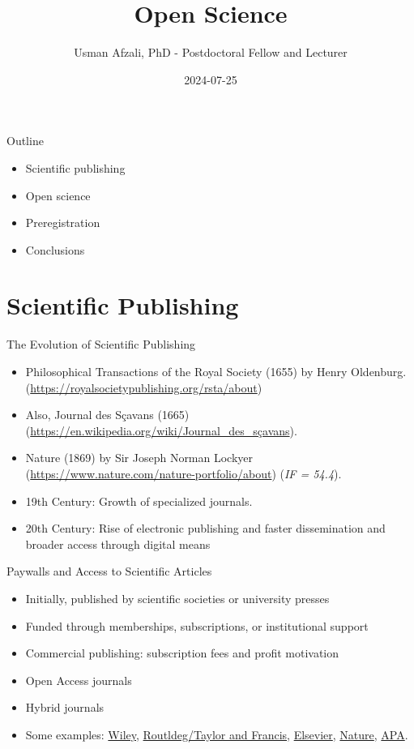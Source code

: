 \documentclass[
  ignorenonframetext,
  aspectratio=169,
]{beamer}
\title{Open Science}
\author{Usman Afzali, PhD - Postdoctoral Fellow and Lecturer}
\date{2024-07-25}
\institute{University of Canterbury}
\providecommand{\tightlist}{%
  \setlength{\itemsep}{0pt}\setlength{\parskip}{0pt}}\usepackage{longtable,booktabs,array}
\begin{document}
\frame{\titlepage}


\begin{frame}{Outline}
\label{outline}
\begin{itemize}
\tightlist
\item
  Scientific publishing
\item
  Open science
\item
  Preregistration
\item
  Conclusions
\end{itemize}
\end{frame}

\section{Scientific Publishing}\label{scientific-publishing}

\begin{frame}{The Evolution of Scientific Publishing}
\label{the-evolution-of-scientific-publishing}
\begin{itemize}[<+->]
\tightlist
\item
  Philosophical Transactions of the Royal Society (1655) by Henry
  Oldenburg. (\url{https://royalsocietypublishing.org/rsta/about})
\item
  Also, Journal des Sçavans (1665)
  (\url{https://en.wikipedia.org/wiki/Journal_des_sçavans}).
\item
  Nature (1869) by Sir Joseph Norman Lockyer
  (\url{https://www.nature.com/nature-portfolio/about}) (\emph{IF =
  54.4}).
\item
  19th Century: Growth of specialized journals.
\item
  20th Century: Rise of electronic publishing and faster dissemination
  and broader access through digital means
\end{itemize}
\end{frame}

\begin{frame}{Paywalls and Access to Scientific Articles}
\label{paywalls-and-access-to-scientific-articles}
\begin{itemize}[<+->]
\tightlist
\item
  Initially, published by scientific societies or university presses
\item
  Funded through memberships, subscriptions, or institutional support
\item
  Commercial publishing: subscription fees and profit motivation
\item
  Open Access journals
\item
  Hybrid journals
\item
  Some examples: \href{https://onlinelibrary.wiley.com}{Wiley},
  \href{https://www.taylorfrancis.com}{Routldeg/Taylor and Francis},
  \href{https://www.elsevier.com/products/sciencedirect/journals}{Elsevier},
  \href{https://www.nature.com/nature/journal-impact}{Nature},
  \href{https://www.apa.org/pubs/journals}{APA}.
\end{itemize}
\end{frame}
\end{document}

